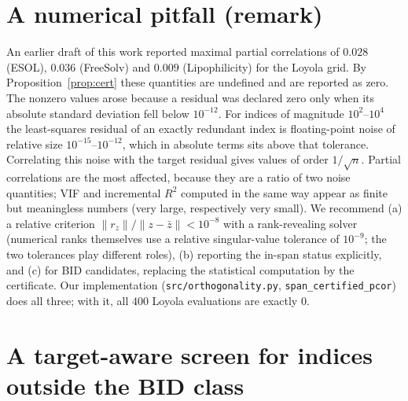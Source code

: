 \documentclass[11pt,a4paper]{article}
\theoremstyle{definition}
\begin{document}
\section{A numerical pitfall (remark)}\label{sec:pitfall}

An earlier draft of this work reported maximal partial correlations of
$0.028$ (ESOL), $0.036$ (FreeSolv) and $0.009$ (Lipophilicity) for the
Loyola grid. By Proposition~\ref{prop:cert} these quantities are
undefined and are reported as zero.
The nonzero values arose because a residual was declared zero only
when its absolute standard deviation fell below $10^{-12}$. For
indices of magnitude $10^2$--$10^4$ the least-squares residual of an
exactly redundant index is floating-point noise of relative size
$10^{-15}$--$10^{-12}$, which in absolute terms sits above that
tolerance. Correlating this noise with the target residual gives
values of order $1/\sqrt{n}$. Partial correlations are the most affected,
because they are a ratio of two noise quantities; VIF and incremental
$R^2$ computed in the same way appear as finite but meaningless numbers
(very large, respectively very small). We recommend
(a) a relative criterion $\|r_z\|/\|z-\bar z\|<10^{-8}$ with a
rank-revealing solver (numerical ranks themselves use a relative
singular-value tolerance of $10^{-9}$; the two tolerances play
different roles), (b) reporting the in-span status explicitly,
and (c) for BID candidates, replacing the statistical computation by
the certificate. Our implementation
(\texttt{src/orthogonality.py}, \texttt{span\_certified\_pcor}) does
all three; with it, all $400$ Loyola evaluations are exactly $0$.

\section{A target-aware screen for indices outside the BID class}\label{sec:nonbid}
\end{document}
